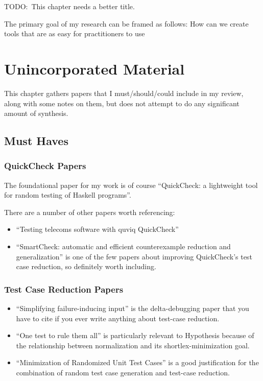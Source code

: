 TODO:\ This chapter needs a better title.

The primary goal of my research can be framed as follows:
How can we create tools that are as easy for practitioners to use 

\chapter{Unincorporated Material}

This chapter gathers papers that I must/should/could include in my review,
along with some notes on them,
but does not attempt to do any significant amount of synthesis.

\section{Must Haves}

\subsection{QuickCheck Papers}

The foundational paper for my work is of course ``QuickCheck: a lightweight tool for random testing of Haskell programs''\cite{DBLP:conf/icfp/ClaessenH00}.

There are a number of other papers worth referencing:

\begin{itemize}
\item ``Testing telecoms software with quviq QuickCheck''\cite{DBLP:conf/erlang/ArtsHJW06}
\item ``SmartCheck: automatic and efficient counterexample reduction and generalization''\cite{DBLP:conf/haskell/Pike14} is one of the few papers about improving QuickCheck's test case reduction,
so definitely worth including.
\end{itemize}

\subsection{Test Case Reduction Papers}

\begin{itemize}
\item ``Simplifying failure-inducing input''\cite{DBLP:conf/issta/HildebrandtZ00} is the delta-debugging paper that you have to cite if you ever write anything about test-case reduction.
\item ``One test to rule them all''\cite{DBLP:conf/issta/GroceHK17} is particularly relevant to Hypothesis because of the relationship between normalization and its shortlex-minimization goal.
\item ``Minimization of Randomized Unit Test Cases''\cite{DBLP:conf/issre/LeiA05} is a good justification for the combination of random test case generation and test-case reduction.
\end{itemize}


